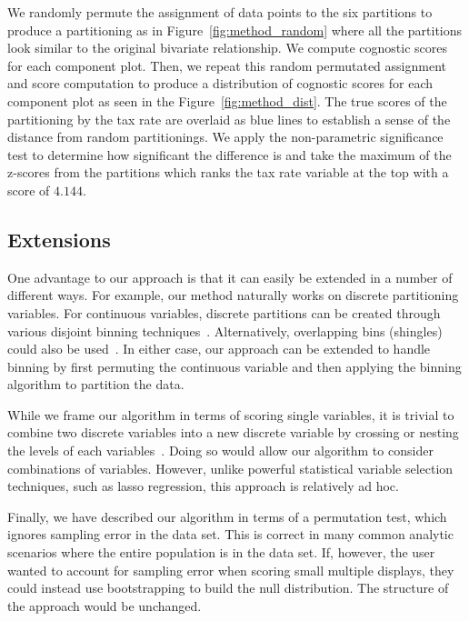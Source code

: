 We randomly permute the assignment of data points to the six partitions to produce a partitioning as in Figure~\ref{fig:method_random} where all the partitions look similar to the original bivariate relationship. We compute cognostic scores for each component plot. Then, we repeat this random permutated assignment and score computation to produce a distribution of cognostic scores for each component plot as seen in the Figure~\ref{fig:method_dist}. The true scores of the partitioning by the tax rate are overlaid as blue lines to establish a sense of the distance from random partitionings. We apply the non-parametric significance test to determine how significant the difference is and take the maximum of the z-scores from the partitions which ranks the tax rate variable at the top with a score of $4.144$.

\subsection{Extensions}
One advantage to our approach is that it can easily be extended in a number of different ways. For example, our method naturally works on discrete partitioning variables. For continuous variables, discrete partitions can be created through various disjoint binning techniques~\cite{Freedman1981,Scott2009}. Alternatively, overlapping bins (shingles) could also be used~\cite{Becker1996}. In either case, our approach can be extended to handle binning by first permuting the continuous variable and then applying the binning algorithm to partition the data.

While we frame our algorithm in terms of scoring single variables, it is trivial to combine two discrete variables into a new discrete variable by crossing or nesting the levels of each variables~\cite{Wilkinson2005GG,Stolte2002}. Doing so would allow our algorithm to consider combinations of variables. However, unlike powerful statistical variable selection techniques, such as lasso regression, this approach is relatively ad hoc.

Finally, we have described our algorithm in terms of a permutation test, which ignores sampling error in the data set. This is correct in many common analytic scenarios where the entire population is in the data set. If, however, the user wanted to account for sampling error when scoring small multiple displays, they could instead use bootstrapping to build the null distribution. The structure of the approach would be unchanged.

